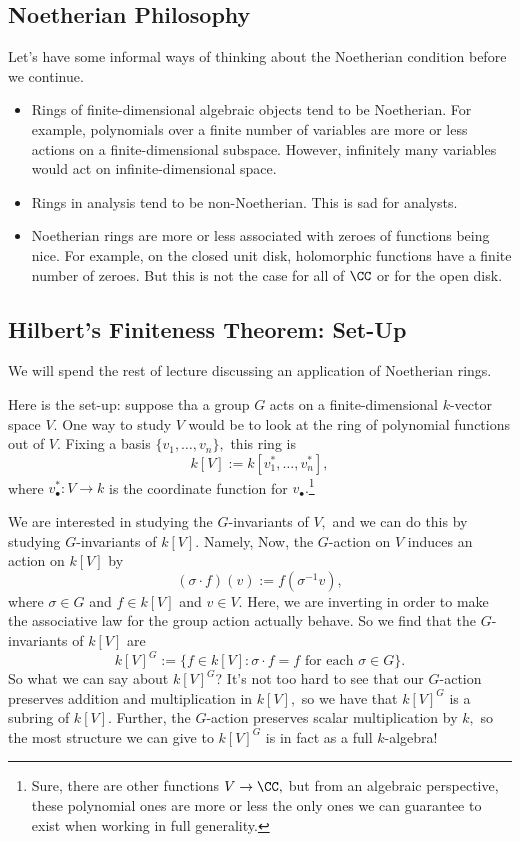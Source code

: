 \documentclass[../notes.tex]{subfiles}
\begin{document}
\subsection{Noetherian Philosophy}
Let's have some informal ways of thinking about the Noetherian condition before we continue.
\begin{itemize}
	\item Rings of finite-dimensional algebraic objects tend to be Noetherian. For example, polynomials over a finite number of variables are more or less actions on a finite-dimensional subspace. However, infinitely many variables would act on infinite-dimensional space.
	\item Rings in analysis tend to be non-Noetherian. This is sad for analysts.
	\item Noetherian rings are more or less associated with zeroes of functions being nice. For example, on the closed unit disk, holomorphic functions have a finite number of zeroes. But this is not the case for all of $\CC$ or for the open disk.
\end{itemize}

\subsection{Hilbert's Finiteness Theorem: Set-Up}
We will spend the rest of lecture discussing an application of Noetherian rings.

Here is the set-up: suppose tha a group $G$ acts on a finite-dimensional $k$-vector space $V.$ One way to study $V$ would be to look at the ring of polynomial functions out of $V.$ Fixing a basis $\{v_1,\ldots,v_n\},$ this ring is
\[k[V]:=k[v_1^*,\ldots,v_n^*],\]
where $v_\bullet^*:V\to k$ is the coordinate function for $v_\bullet.$\footnote{Sure, there are other functions $V\to\CC,$ but from an algebraic perspective, these polynomial ones are more or less the only ones we can guarantee to exist when working in full generality.}

We are interested in studying the $G$-invariants of $V,$ and we can do this by studying $G$-invariants of $k[V].$ Namely,  Now, the $G$-action on $V$ induces an action on $k[V]$ by
\[(\sigma\cdot f)(v):=f(\sigma^{-1}v),\]
where $\sigma\in G$ and $f\in k[V]$ and $v\in V.$ Here, we are inverting in order to make the associative law for the group action actually behave. So we find that the $G$-invariants of $k[V]$ are
\[k[V]^G:=\{f\in k[V]:\sigma\cdot f=f\text{ for each }\sigma\in G\}.\]
So what we can say about $k[V]^G$? It's not too hard to see that our $G$-action preserves addition and multiplication in $k[V],$ so we have that $k[V]^G$ is a subring of $k[V].$ Further, the $G$-action preserves scalar multiplication by $k,$ so the most structure we can give to $k[V]^G$ is in fact as a full $k$-algebra!
\end{document}
